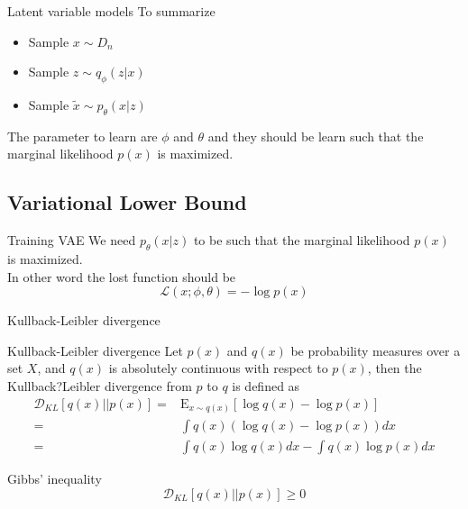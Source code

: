 \documentclass{beamer}
\newcommand{\kldiv}{\mathcal{D}_{KL}}
\newcommand{\E}{\mathrm{E}}
\begin{document}
\begin{frame}{Latent variable models}
	To summarize
	\begin{itemize}
		\item Sample $x \sim D_n$
		\item Sample $z \sim q_\phi(z|x)$
		\item Sample $\tilde{x} \sim p_\theta(x|z)$
	\end{itemize}
	The parameter to learn are $\phi$ and $\theta$ and they should be learn such that the marginal likelihood $p(x)$ is maximized.
\end{frame}

\subsection{Variational Lower Bound}

\begin{frame}{Training VAE}
	We need $p_\theta(x|z)$ to be such that the marginal likelihood $p(x)$ is maximized. \\
	
	In other word the lost function should be
	\huge
	\[
		\mathcal{L}(x;\phi, \theta) = -\log p(x)	
	\]
\end{frame}

\begin{frame}{Kullback-Leibler divergence}

	\begin{block}{Kullback-Leibler divergence}
		Let $p(x)$ and $q(x)$ be probability measures over a set $X$, and $q(x)$ is absolutely continuous with respect to $p(x)$, then the Kullback?Leibler divergence from $p$ to $q$ is defined as
		\begin{equation*}
			\begin{split}
			\kldiv[q(x)||p(x)] 
			=& \E_{x\sim q(x)}[ \log q(x) - \log p(x)]\\
			=& \int q(x)(\log q(x)-\log p(x))dx\\
			=& \int q(x)\log q(x)dx-\int q(x)\log p(x)dx
			\end{split}
		\end{equation*}
	\end{block}
	\begin{block}{Gibbs' inequality}
		\begin{equation*}
			\kldiv[q(x)||p(x)] \geq 0
		\end{equation*} 
	\end{block}
\end{frame}
\end{document}
